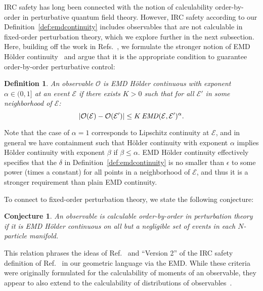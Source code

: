 \documentclass[letterpaper,11pt]{article}
\newcommand{\E}{\mathcal{E}}
\DeclareRobustCommand{\Ref}[1]{Ref.~\cite{#1}}
\DeclareRobustCommand{\Refs}[1]{Refs.~\cite{#1}}
\newtheorem{definition}{Definition}
\newtheorem{conjecture}{Conjecture}
\begin{document}
IRC safety has long been connected with the notion of calculability order-by-order in perturbative quantum field theory.
%
However, IRC safety according to our Definition~\ref{def:emdcontinuity} includes observables that are not calculable in fixed-order perturbation theory, which we explore further in the next subsection.
%
Here, building off the work in \Refs{Sterman:1979uw,Banfi:2004yd}, we formulate the stronger notion of EMD H\"older continuity~\cite{Ortega2000,Gilbarg2001} and argue that it is the appropriate condition to guarantee order-by-order perturbative control:
%
\begin{definition}\label{def:emdholdercontinuity}
An observable $\mathcal O$ is EMD H\"older continuous with exponent $\alpha\in(0,1]$ at an event $\E$ if there exists $K>0$ such that for all $\E'$ in some neighborhood of $\E$:
%
\begin{equation}
\label{eq:Holder}
|\mathcal O(\E)-\mathcal O(\E')|\le K\,\text{\emph{EMD}}(\E,\E')^\alpha.
\end{equation}
\end{definition}
%
\noindent Note that the case of $\alpha=1$ corresponds to Lipschitz continuity at $\E$, and in general we have containment such that H\"older continuity with exponent $\alpha$ implies H\"older continuity with exponent $\beta$ if $\beta\le\alpha$.
%
EMD H\"older continuity effectively specifies that the $\delta$ in Definition~\ref{def:emdcontinuity} is no smaller than $\epsilon$ to some power (times a constant) for all points in a neighborhood of $\E$, and thus it is a stronger requirement than plain EMD continuity.


To connect to fixed-order perturbation theory, we state the following conjecture:
%
\begin{framed}
\begin{conjecture}\label{conj:fopt}
%
An observable is calculable order-by-order in perturbation theory if it is EMD H\"older continuous on all but a negligible set of events in each $N$-particle manifold. 
\end{conjecture}
\end{framed}
%
\noindent This relation phrases the ideas of \Ref{Sterman:1979uw} and ``Version 2'' of the IRC safety definition of \Ref{Banfi:2004yd} in our geometric language via the EMD.
%
While these criteria were originally formulated for the calculability of moments of an observable, they appear to also extend to the calculability of distributions of observables~\cite{Sterman:2006uk}.
\end{document}
